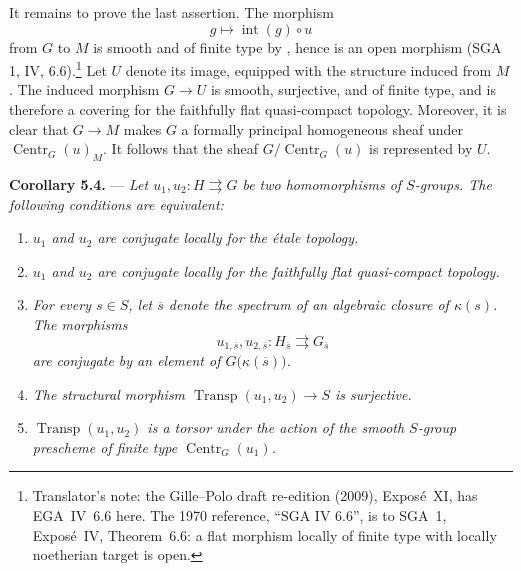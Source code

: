 It remains to prove the last assertion.  The morphism
\[
  g\longmapsto\operatorname{int}(g)\circ u
\]
from \(G\) to \(M\) is smooth and of finite type by , hence is an
open morphism (SGA 1, IV, 6.6).\footnote{Translator's note: the Gille--Polo draft
re-edition (2009), Exposé~XI, has EGA~IV~6.6 here. The 1970 reference, ``SGA IV 6.6'', is to
SGA~1, Exposé~IV, Theorem~6.6: a flat morphism locally of finite type with locally noetherian
target is open.}  Let \(U\) denote its image, equipped
with the structure induced from \(M\).  The induced morphism
\(G\to U\) is smooth, surjective, and of finite type, and is
therefore a covering for the faithfully flat quasi-compact
topology.  Moreover, it is clear that 
\(G\to M\) makes \(G\) a formally principal homogeneous sheaf under
\(\operatorname{Centr}_G(u)_M\).  It follows that the sheaf
\(G/\operatorname{Centr}_G(u)\) is represented by \(U\).

\medskip
\noindent{}\textbf{Corollary 5.4.} ---
\textit{Let \(u_1,u_2:H\rightrightarrows G\) be two homomorphisms of
\(S\)-groups.  The following conditions are equivalent:}

\begin{enumerate}
\item[(i)] 
\textit{\(u_1\) and \(u_2\) are conjugate locally for the étale
topology.}

\item[(i bis)] 
\textit{\(u_1\) and \(u_2\) are conjugate locally for the faithfully
flat quasi-compact topology.}

\item[(ii)] 
\textit{For every \(s\in S\), let \(\overline{s}\) denote the
spectrum of an algebraic closure of \(\kappa(s)\).  The morphisms
\[
  u_{1,\overline{s}},u_{2,\overline{s}}:
  H_{\overline{s}}\rightrightarrows G_{\overline{s}}
\]
are conjugate by an element of
\(G\bigl(\kappa(\overline{s})\bigr)\).}

\item[(ii bis)] 
\textit{The structural morphism
\(\operatorname{Transp}(u_1,u_2)\to S\) is surjective.}

\item[(iii)] 
\textit{\(\operatorname{Transp}(u_1,u_2)\) is a torsor under the
action of the smooth \(S\)-group prescheme of finite type
\(\operatorname{Centr}_G(u_1)\).}
\end{enumerate}

